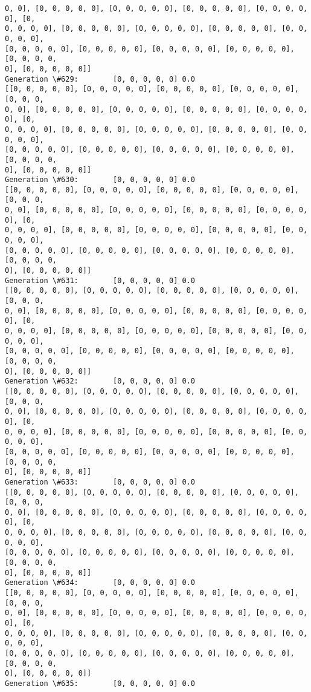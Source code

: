 \documentclass[11pt]{article}
\begin{document}
\begin{Verbatim}[commandchars=\\\{\}]
0, 0], [0, 0, 0, 0, 0], [0, 0, 0, 0, 0], [0, 0, 0, 0, 0], [0, 0, 0, 0, 0], [0,
0, 0, 0, 0], [0, 0, 0, 0, 0], [0, 0, 0, 0, 0], [0, 0, 0, 0, 0], [0, 0, 0, 0, 0],
[0, 0, 0, 0, 0], [0, 0, 0, 0, 0], [0, 0, 0, 0, 0], [0, 0, 0, 0, 0], [0, 0, 0, 0,
0], [0, 0, 0, 0, 0]]
Generation \#629:        [0, 0, 0, 0, 0] 0.0
[[0, 0, 0, 0, 0], [0, 0, 0, 0, 0], [0, 0, 0, 0, 0], [0, 0, 0, 0, 0], [0, 0, 0,
0, 0], [0, 0, 0, 0, 0], [0, 0, 0, 0, 0], [0, 0, 0, 0, 0], [0, 0, 0, 0, 0], [0,
0, 0, 0, 0], [0, 0, 0, 0, 0], [0, 0, 0, 0, 0], [0, 0, 0, 0, 0], [0, 0, 0, 0, 0],
[0, 0, 0, 0, 0], [0, 0, 0, 0, 0], [0, 0, 0, 0, 0], [0, 0, 0, 0, 0], [0, 0, 0, 0,
0], [0, 0, 0, 0, 0]]
Generation \#630:        [0, 0, 0, 0, 0] 0.0
[[0, 0, 0, 0, 0], [0, 0, 0, 0, 0], [0, 0, 0, 0, 0], [0, 0, 0, 0, 0], [0, 0, 0,
0, 0], [0, 0, 0, 0, 0], [0, 0, 0, 0, 0], [0, 0, 0, 0, 0], [0, 0, 0, 0, 0], [0,
0, 0, 0, 0], [0, 0, 0, 0, 0], [0, 0, 0, 0, 0], [0, 0, 0, 0, 0], [0, 0, 0, 0, 0],
[0, 0, 0, 0, 0], [0, 0, 0, 0, 0], [0, 0, 0, 0, 0], [0, 0, 0, 0, 0], [0, 0, 0, 0,
0], [0, 0, 0, 0, 0]]
Generation \#631:        [0, 0, 0, 0, 0] 0.0
[[0, 0, 0, 0, 0], [0, 0, 0, 0, 0], [0, 0, 0, 0, 0], [0, 0, 0, 0, 0], [0, 0, 0,
0, 0], [0, 0, 0, 0, 0], [0, 0, 0, 0, 0], [0, 0, 0, 0, 0], [0, 0, 0, 0, 0], [0,
0, 0, 0, 0], [0, 0, 0, 0, 0], [0, 0, 0, 0, 0], [0, 0, 0, 0, 0], [0, 0, 0, 0, 0],
[0, 0, 0, 0, 0], [0, 0, 0, 0, 0], [0, 0, 0, 0, 0], [0, 0, 0, 0, 0], [0, 0, 0, 0,
0], [0, 0, 0, 0, 0]]
Generation \#632:        [0, 0, 0, 0, 0] 0.0
[[0, 0, 0, 0, 0], [0, 0, 0, 0, 0], [0, 0, 0, 0, 0], [0, 0, 0, 0, 0], [0, 0, 0,
0, 0], [0, 0, 0, 0, 0], [0, 0, 0, 0, 0], [0, 0, 0, 0, 0], [0, 0, 0, 0, 0], [0,
0, 0, 0, 0], [0, 0, 0, 0, 0], [0, 0, 0, 0, 0], [0, 0, 0, 0, 0], [0, 0, 0, 0, 0],
[0, 0, 0, 0, 0], [0, 0, 0, 0, 0], [0, 0, 0, 0, 0], [0, 0, 0, 0, 0], [0, 0, 0, 0,
0], [0, 0, 0, 0, 0]]
Generation \#633:        [0, 0, 0, 0, 0] 0.0
[[0, 0, 0, 0, 0], [0, 0, 0, 0, 0], [0, 0, 0, 0, 0], [0, 0, 0, 0, 0], [0, 0, 0,
0, 0], [0, 0, 0, 0, 0], [0, 0, 0, 0, 0], [0, 0, 0, 0, 0], [0, 0, 0, 0, 0], [0,
0, 0, 0, 0], [0, 0, 0, 0, 0], [0, 0, 0, 0, 0], [0, 0, 0, 0, 0], [0, 0, 0, 0, 0],
[0, 0, 0, 0, 0], [0, 0, 0, 0, 0], [0, 0, 0, 0, 0], [0, 0, 0, 0, 0], [0, 0, 0, 0,
0], [0, 0, 0, 0, 0]]
Generation \#634:        [0, 0, 0, 0, 0] 0.0
[[0, 0, 0, 0, 0], [0, 0, 0, 0, 0], [0, 0, 0, 0, 0], [0, 0, 0, 0, 0], [0, 0, 0,
0, 0], [0, 0, 0, 0, 0], [0, 0, 0, 0, 0], [0, 0, 0, 0, 0], [0, 0, 0, 0, 0], [0,
0, 0, 0, 0], [0, 0, 0, 0, 0], [0, 0, 0, 0, 0], [0, 0, 0, 0, 0], [0, 0, 0, 0, 0],
[0, 0, 0, 0, 0], [0, 0, 0, 0, 0], [0, 0, 0, 0, 0], [0, 0, 0, 0, 0], [0, 0, 0, 0,
0], [0, 0, 0, 0, 0]]
Generation \#635:        [0, 0, 0, 0, 0] 0.0

\end{Verbatim}
\end{document}
